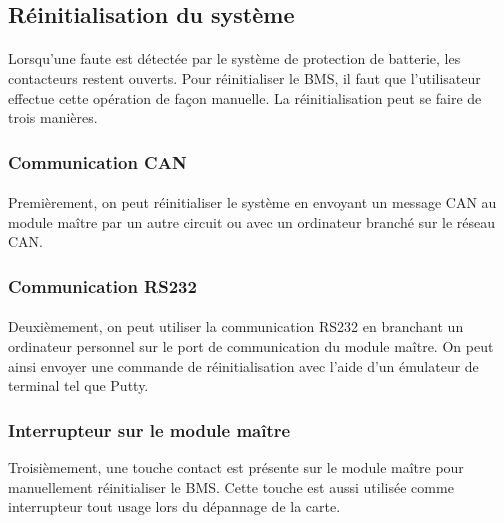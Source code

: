 \subsection{Réinitialisation du système}

	\paragraph*{}
	Lorsqu'une faute est détectée par le système de protection de batterie, les contacteurs restent ouverts. Pour réinitialiser le BMS, il faut que l'utilisateur effectue cette opération de façon manuelle. La réinitialisation peut se faire de trois manières.

	\subsubsection{Communication CAN}
		\paragraph*{}
		Premièrement, on peut réinitialiser le système en envoyant un message CAN au module maître par un autre circuit ou avec un ordinateur branché sur le réseau CAN.

	\subsubsection{Communication RS232}
		\paragraph*{}
		Deuxièmement, on peut utiliser la communication RS232 en branchant un ordinateur personnel sur le port de communication du module maître. On peut ainsi envoyer une commande de réinitialisation avec l'aide d'un émulateur de terminal tel que Putty.

	\subsubsection{Interrupteur sur le module maître}
		Troisièmement, une touche contact est présente sur le module maître pour manuellement réinitialiser le BMS. Cette touche est aussi utilisée comme interrupteur tout usage lors du dépannage de la carte.